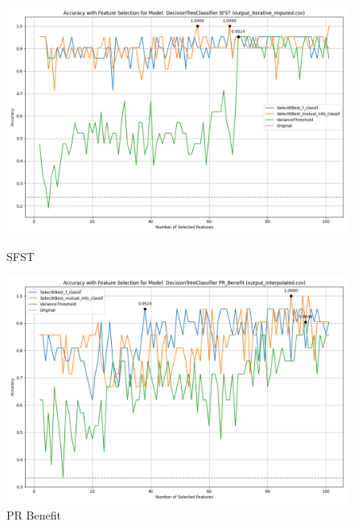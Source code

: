 \begin{figure}[H]
    \centering
    \begin{minipage}[b]{0.45\textwidth}
        \includegraphics[width=\textwidth]{class_all_section/images/feature_selection_accuracy_plot_output_iterative_imputedcsv_DecisionTreeClassifier_SFST.png}
        \caption{SFST}
        \label{fig:sfst_class}
    \end{minipage}
    \hfill
    \begin{minipage}[b]{0.45\textwidth}
        \includegraphics[width=\textwidth]{class_all_section/images/feature_selection_accuracy_plot_output_interpolatedcsv_DecisionTreeClassifier_PR_Benefit.png}
        \caption{PR Benefit}
        \label{fig:pr_ben_class}
    \end{minipage}
\end{figure}

